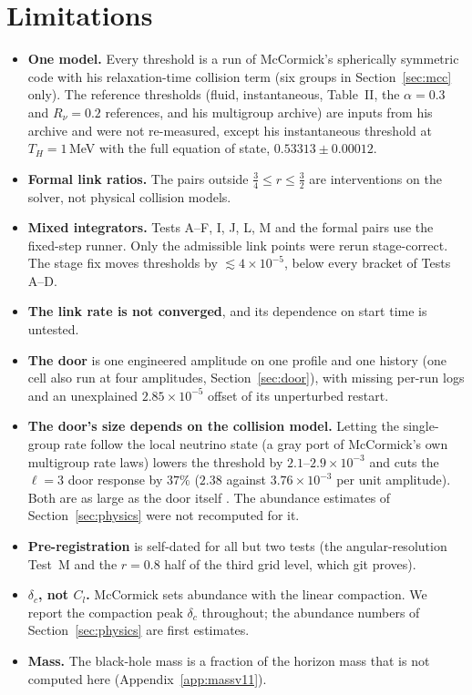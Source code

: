 \section{Limitations}\label{sec:limits}

\begin{itemize}
\item \textbf{One model.} Every threshold is a run of McCormick's spherically symmetric code with his relaxation-time collision term (six groups in Section~\ref{sec:mcc} only). The reference thresholds (fluid, instantaneous, Table~II, the $\alpha=0.3$ and $R_\nu=0.2$ references, and his multigroup archive) are inputs from his archive and were not re-measured, except his instantaneous threshold at $T_H=1$\,MeV with the full equation of state, $0.53313\pm0.00012$.
\item \textbf{Formal link ratios.} The pairs outside $\tfrac34\le r\le\tfrac32$ are interventions on the solver, not physical collision models.
\item \textbf{Mixed integrators.} Tests A--F, I, J, L, M and the formal pairs use the fixed-step runner. Only the admissible link points were rerun stage-correct. The stage fix moves thresholds by $\lesssim4\times10^{-5}$, below every bracket of Tests A--D.
\item \textbf{The link rate is not converged}, and its dependence on start time is untested.
\item \textbf{The door} is one engineered amplitude on one profile and one history (one cell also run at four amplitudes, Section~\ref{sec:door}), with missing per-run logs and an unexplained $2.85\times10^{-5}$ offset of its unperturbed restart.
\item \textbf{The door's size depends on the collision model.} Letting the single-group rate follow the local neutrino state (a gray port of McCormick's own multigroup rate laws) lowers the threshold by $2.1$--$2.9\times10^{-3}$ and cuts the $\ell=3$ door response by $37\%$ ($2.38$ against $3.76\times10^{-3}$ per unit amplitude). Both are as large as the door itself . The abundance estimates of Section~\ref{sec:physics} were not recomputed for it.
\item \textbf{Pre-registration} is self-dated for all but two tests (the angular-resolution Test~M and the $r=0.8$ half of the third grid level, which git proves).
\item \textbf{$\delta_c$, not $C_l$.} McCormick sets abundance with the linear compaction. We report the compaction peak $\delta_c$ throughout; the abundance numbers of Section~\ref{sec:physics} are first estimates.
\item \textbf{Mass.} The black-hole mass is a fraction of the horizon mass that is not computed here (Appendix~\ref{app:massv11}).
\end{itemize}

